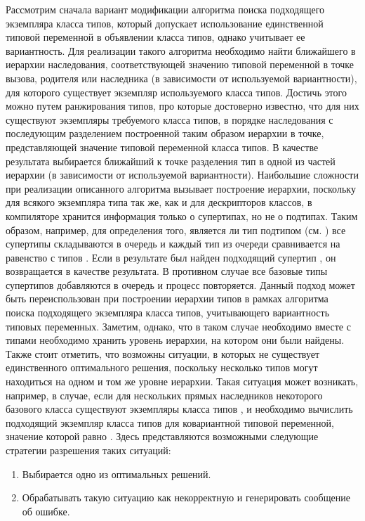 Рассмотрим сначала вариант модификации алгоритма поиска подходящего экземпляра класса типов, который допускает использование единственной типовой переменной в объявлении класса типов, однако учитывает ее вариантность. Для реализации такого алгоритма необходимо найти ближайшего в иерархии наследования, соответствующей значению типовой переменной в точке вызова, родителя или наследника (в зависимости от используемой вариантности), для которого существует экземпляр используемого класса типов. Достичь этого можно путем ранжирования типов, про которые достоверно известно, что для них существуют экземпляры требуемого класса типов, в порядке наследования с последующим разделением построенной таким образом иерархии в точке, представляющей значение типовой переменной класса типов. В качестве результата выбирается ближайший к точке разделения тип в одной из частей иерархии (в зависимости от используемой вариантности). Наибольшие сложности при реализации описанного алгоритма вызывает построение иерархии, поскольку для всякого экземпляра типа так же, как и для дескрипторов классов, в компиляторе хранится информация только о супертипах, но не о подтипах. Таким образом, например, для определения того, является ли тип  подтипом  (см. ) все супертипы  складываются в очередь и каждый тип из очереди сравнивается на равенство с типов . Если в результате был найден подходящий супертип , он возвращается в качестве результата. В противном случае все базовые типы супертипов  добавляются в очередь и процесс повторяется. Данный подход может быть переиспользован при построении иерархии типов в рамках алгоритма поиска подходящего экземпляра класса типов, учитывающего вариантность типовых переменных. Заметим, однако, что в таком случае необходимо вместе с типами необходимо хранить уровень иерархии, на котором они были найдены. Также стоит отметить, что возможны ситуации, в которых не существует единственного оптимального решения, поскольку несколько типов могут находиться на одном и том же уровне иерархии. Такая ситуация может возникать, например, в случае, если для нескольких прямых наследников некоторого базового класса  существуют экземпляры класса типов , и необходимо вычислить подходящий экземпляр класса типов  для ковариантной типовой переменной, значение которой равно . Здесь представляются возможными следующие стратегии разрешения таких ситуаций:
\begin{enumerate}
    \item Выбирается одно из оптимальных решений. 
    \item Обрабатывать такую ситуацию как некорректную и генерировать сообщение об ошибке.
\end{enumerate}
